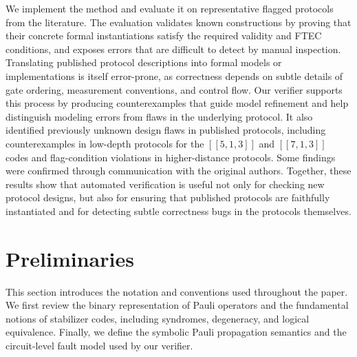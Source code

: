 \documentclass[acmsmall,screen,review,anonymous,nonacm]{acmart}
\begin{document}
We implement the method and evaluate it on representative flagged protocols from the literature. 
The evaluation validates known constructions
by proving that their concrete formal instantiations satisfy the required
validity and FTEC conditions, and exposes errors that are difficult
to detect by manual inspection.
Translating published protocol descriptions into formal models or
implementations is itself error-prone, as correctness depends on subtle
details of gate ordering, measurement conventions, and control flow.
Our verifier supports this process by producing counterexamples that
guide model refinement and help distinguish modeling errors from flaws
in the underlying protocol.
It also identified previously unknown design flaws in published protocols, including counterexamples in low-depth protocols for the
$[[5,1,3]]$ and $[[7,1,3]]$ codes and flag-condition violations in
higher-distance protocols. Some findings were confirmed through communication with the original authors. Together, these results show that automated verification
is useful not only for checking new protocol designs, but also for ensuring that
published protocols are faithfully instantiated and for detecting subtle
correctness bugs in the protocols themselves.





\section{Preliminaries}
This section introduces the notation and conventions used throughout the paper. 
We first review the binary representation of Pauli operators and the fundamental notions of stabilizer codes, including syndromes, degeneracy, and logical equivalence.
 Finally, we define the symbolic Pauli propagation semantics and the circuit-level fault model used by our verifier.
\end{document}
